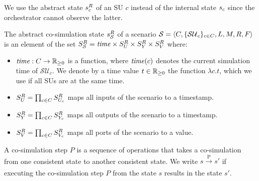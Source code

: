We use the abstract state $s^{R}_{c}$ of an SU $c$ instead of the internal state $s_{c}$ since the orchestrator cannot observe the latter.

\begin{definition}\label{def:cosimstate}
  The abstract co-simulation state $s^{R}_{\mathcal{S}}$ of a scenario $\mathcal{S} = \left\langle C, \{\mathcal{SU}_c\}_{c \in C}, L, M, R, F \right\rangle $ is an element of the set $S^{R}_{\mathcal{S}} = \mathit{time} \times S^{R}_{U} \times S^{R}_{Y} \times S^{R}_{V}$
  where:
  \begin{itemize}
    \item $\mathit{time} : C \to \mathbb{R}_{\geq 0}$ is a function, where $\mathit{time}(c)$ denotes the current simulation time of $\mathcal{SU}_c$.
    We denote by a time value $t \in \mathbb{R}_{\geq 0}$ the function $\lambda c.t$, which we use if all SUs are at the same time.
    \item $S^{R}_{U} = \prod_{c \in C} S^{R}_{U_{c}}$ maps all inputs of the scenario to a timestamp. 
    \item $S^{R}_{Y} = \prod_{c \in C} S^{R}_{Y_{c}}$ maps all outputs of the scenario to a timestamp. 
    \item $S^{R}_{V} =  \prod_{c \in C} S^{R}_{V_c}$ maps all ports of the scenario to a value. 
  \end{itemize}
\end{definition}

A co-simulation step $P$ is a sequence of operations that takes a co-simulation from one consistent state to another consistent state.
We write $ s \xrightarrow[\text{}]{\text{P}} s'$ if executing the co-simulation step $P$ from the state $s$ results in the state $s'$.

